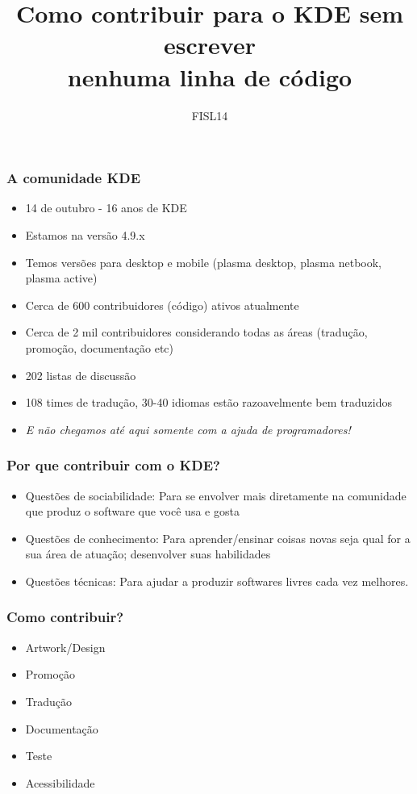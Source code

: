 \documentclass[hyperref={pdfpagelabels=false}]{beamer}
\title[KDE]{Como contribuir para o KDE sem escrever \\nenhuma linha de código}
\date{FISL14}
\newif\ifplacelogo %
\begin{document}
\placelogofalse
\begin{frame}
   \titlepage
\end{frame}
\placelogotrue
\begin{frame}
   \frametitle{A comunidade KDE}
   \begin{itemize}
      \item 14 de outubro - 16 anos de KDE
      \item Estamos na versão 4.9.x
      \item Temos versões para desktop e mobile (plasma desktop, plasma netbook, plasma active)
      \item Cerca de 600 contribuidores (código) ativos atualmente
      \item Cerca de 2 mil contribuidores considerando todas as áreas (tradução, promoção, documentação etc)
      \item 202 listas de discussão
      \item 108 times de tradução, 30-40 idiomas estão razoavelmente bem traduzidos
      \item \emph{E não chegamos até aqui somente com a ajuda de programadores!}
   \end{itemize}
\end{frame}
\begin{frame}
   \frametitle{Por que contribuir com o KDE?}
   \begin{itemize}
      \item Questões de sociabilidade: Para se envolver mais diretamente na comunidade que produz o software que você usa e gosta
      \item Questões de conhecimento: Para aprender/ensinar coisas novas seja qual for a sua área de atuação; desenvolver suas habilidades
      \item Questões técnicas: Para ajudar a produzir softwares livres cada vez melhores.
   \end{itemize}
\end{frame}
\begin{frame}
   \frametitle{Como contribuir?}
   \begin{itemize}
      \item Artwork/Design
      \item Promoção
      \item Tradução
      \item Documentação
      \item Teste
      \item Acessibilidade
   \end{itemize}
\end{frame}
\end{document}
